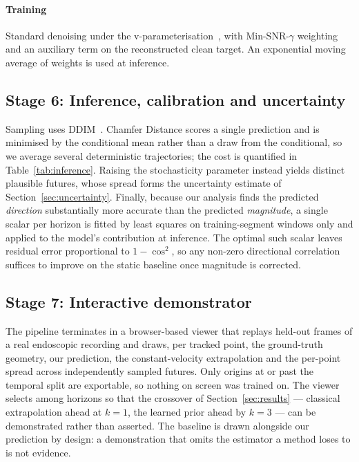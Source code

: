 \documentclass[conference]{IEEEtran}
\begin{document}
\paragraph{Training} Standard denoising under the
v-parameterisation~\cite{salimans2022progressive}, with Min-SNR-$\gamma$
weighting~\cite{hang2023minsnr} and an auxiliary term on the reconstructed clean
target. An exponential moving average of weights is used at inference.

\subsection{Stage 6: Inference, calibration and uncertainty}
Sampling uses DDIM~\cite{song2021ddim}. Chamfer Distance scores a single prediction
and is minimised by the conditional mean rather than a draw from the conditional,
so we average several deterministic trajectories; the cost is quantified in
Table~\ref{tab:inference}. Raising the stochasticity parameter instead yields
distinct plausible futures, whose spread forms the uncertainty estimate of
Section~\ref{sec:uncertainty}. Finally, because our analysis finds the predicted
\emph{direction} substantially more accurate than the predicted \emph{magnitude}, a
single scalar per horizon is fitted by least squares on training-segment windows
only and applied to the model's contribution at inference. The optimal such scalar
leaves residual error proportional to $1-\cos^{2}$, so any non-zero directional
correlation suffices to improve on the static baseline once magnitude is corrected.

\subsection{Stage 7: Interactive demonstrator}
\label{sec:demo}
The pipeline terminates in a browser-based viewer that replays held-out frames of a
real endoscopic recording and draws, per tracked point, the ground-truth geometry, our
prediction, the constant-velocity extrapolation and the per-point spread across
independently sampled futures. Only origins at or past the temporal split are
exportable, so nothing on screen was trained on. The viewer selects among horizons so
that the crossover of Section~\ref{sec:results} --- classical extrapolation ahead at
$k{=}1$, the learned prior ahead by $k{=}3$ --- can be demonstrated rather than
asserted. The baseline is drawn alongside our prediction by design: a demonstration
that omits the estimator a method loses to is not evidence.
\end{document}
